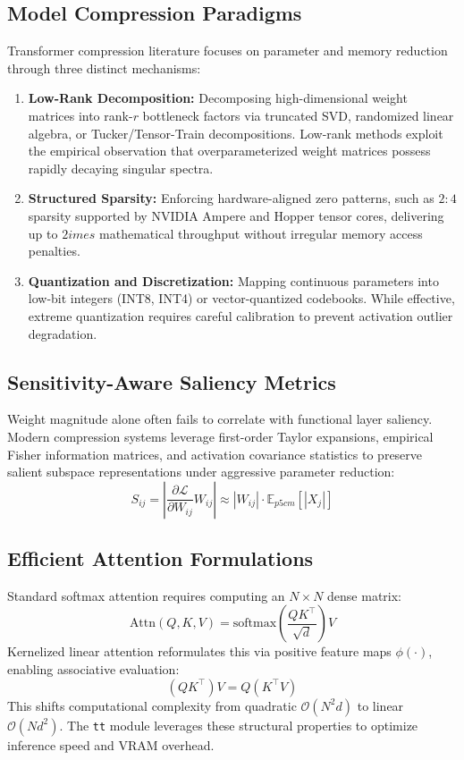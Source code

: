 \subsection{Model Compression Paradigms}
Transformer compression literature focuses on parameter and memory reduction through three distinct mechanisms:
\begin{enumerate}
\item \textbf{Low-Rank Decomposition:} Decomposing high-dimensional weight matrices into rank-$r$ bottleneck factors via truncated SVD, randomized linear algebra, or Tucker/Tensor-Train decompositions. Low-rank methods exploit the empirical observation that overparameterized weight matrices possess rapidly decaying singular spectra.
\item \textbf{Structured Sparsity:} Enforcing hardware-aligned zero patterns, such as $2:4$ sparsity supported by NVIDIA Ampere and Hopper tensor cores, delivering up to $2	imes$ mathematical throughput without irregular memory access penalties.
\item \textbf{Quantization and Discretization:} Mapping continuous parameters into low-bit integers (INT8, INT4) or vector-quantized codebooks. While effective, extreme quantization requires careful calibration to prevent activation outlier degradation.
\end{enumerate}

\subsection{Sensitivity-Aware Saliency Metrics}
Weight magnitude alone often fails to correlate with functional layer saliency. Modern compression systems leverage first-order Taylor expansions, empirical Fisher information matrices, and activation covariance statistics to preserve salient subspace representations under aggressive parameter reduction:
\[
S_{ij} = \left| \frac{\partial \mathcal{L}}{\partial W_{ij}} W_{ij} \right| \approx |W_{ij}| \cdot \mathbb{E}_{p{5cm}}[|X_j|]
\]

\subsection{Efficient Attention Formulations}
Standard softmax attention requires computing an $N \times N$ dense matrix:
\[
\text{Attn}(Q, K, V) = \text{softmax}\left(\frac{Q K^\top}{\sqrt{d}}\right) V
\]
Kernelized linear attention reformulates this via positive feature maps $\phi(\cdot)$, enabling associative evaluation:
\[
(Q K^\top) V = Q (K^\top V)
\]
This shifts computational complexity from quadratic $\mathcal{O}(N^2 d)$ to linear $\mathcal{O}(N d^2)$. The \texttt{tt} module leverages these structural properties to optimize inference speed and VRAM overhead.


